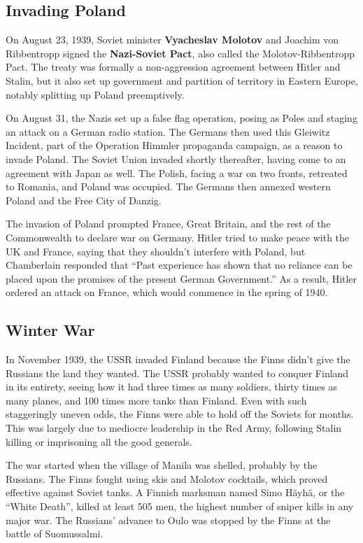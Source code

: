 \subsection*{Invading Poland}

On August 23, 1939, Soviet minister \textbf{Vyacheslav Molotov} and Joachim von Ribbentropp signed the
\textbf{Nazi-Soviet Pact}, also called the Molotov-Ribbentropp Pact.
The treaty was formally a non-aggression agreement between Hitler and Stalin,
but it also set up government and partition of territory in Eastern Europe,
notably splitting up Poland preemptively.

On August 31, the Nazis set up a false flag operation,
posing as Poles and staging an attack on a German radio station.
The Germans then used this Gleiwitz Incident, part of the Operation Himmler propaganda campaign,
as a reason to invade Poland.
The Soviet Union invaded shortly thereafter, having come to an agreement with Japan as well.
The Polish, facing a war on two fronts, retreated to Romania, and Poland was occupied.
The Germans then annexed western Poland and the Free City of Danzig.

The invasion of Poland prompted France, Great Britain, and the rest of the Commonwealth to declare war on Germany.
Hitler tried to make peace with the UK and France, saying that they shouldn't interfere with Poland,
but Chamberlain responded that
``Past experience has shown that no reliance can be placed upon the promises of the present German Government.''
As a result, Hitler ordered an attack on France, which would commence in the spring of 1940.

\subsection*{Winter War}

In November 1939, the USSR invaded Finland because the Finns didn't give the Russians the land they wanted.
The USSR probably wanted to conquer Finland in its entirety,
seeing how it had three times as many soldiers, thirty times as many planes, and 100 times more tanks than Finland.
Even with such staggeringly uneven odds, the Finns were able to hold off the Soviets for months.
This was largely due to mediocre leadership in the Red Army,
following Stalin killing or imprisoning all the good generals.

The war started when the village of Manila was shelled, probably by the Russians.
The Finns fought using skis and Molotov cocktails, which proved effective against Soviet tanks.
A Finnish marksman named Simo H\"ayh\"a, or the ``White Death'', killed at least 505 men,
the highest number of sniper kills in any major war.
The Russians' advance to Oulo was stopped by the Finns at the battle of Suomussalmi.

